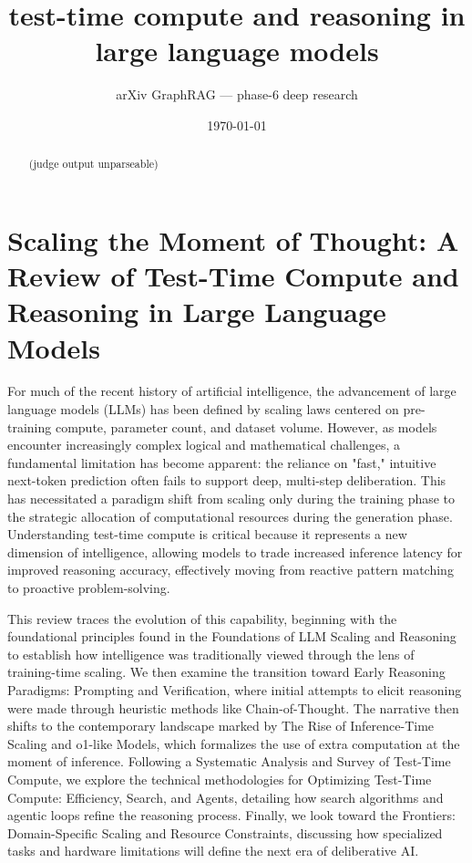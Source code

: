 \documentclass[11pt]{article}
\title{test-time compute and reasoning in large language models}
\author{arXiv GraphRAG --- phase-6 deep research}
\date{\today}
\begin{document}
\maketitle

\begin{abstract}
(judge output unparseable)
\end{abstract}

\section{Scaling the Moment of Thought: A Review of Test-Time Compute and Reasoning in Large Language Models}

For much of the recent history of artificial intelligence, the advancement of large language models (LLMs) has been defined by scaling laws centered on pre-training compute, parameter count, and dataset volume. However, as models encounter increasingly complex logical and mathematical challenges, a fundamental limitation has become apparent: the reliance on "fast," intuitive next-token prediction often fails to support deep, multi-step deliberation. This has necessitated a paradigm shift from scaling only during the training phase to the strategic allocation of computational resources during the generation phase. Understanding test-time compute is critical because it represents a new dimension of intelligence, allowing models to trade increased inference latency for improved reasoning accuracy, effectively moving from reactive pattern matching to proactive problem-solving.

This review traces the evolution of this capability, beginning with the foundational principles found in the Foundations of LLM Scaling and Reasoning to establish how intelligence was traditionally viewed through the lens of training-time scaling. We then examine the transition toward Early Reasoning Paradigms: Prompting and Verification, where initial attempts to elicit reasoning were made through heuristic methods like Chain-of-Thought. The narrative then shifts to the contemporary landscape marked by The Rise of Inference-Time Scaling and o1-like Models, which formalizes the use of extra computation at the moment of inference. Following a Systematic Analysis and Survey of Test-Time Compute, we explore the technical methodologies for Optimizing Test-Time Compute: Efficiency, Search, and Agents, detailing how search algorithms and agentic loops refine the reasoning process. Finally, we look toward the Frontiers: Domain-Specific Scaling and Resource Constraints, discussing how specialized tasks and hardware limitations will define the next era of deliberative AI.
\end{document}
